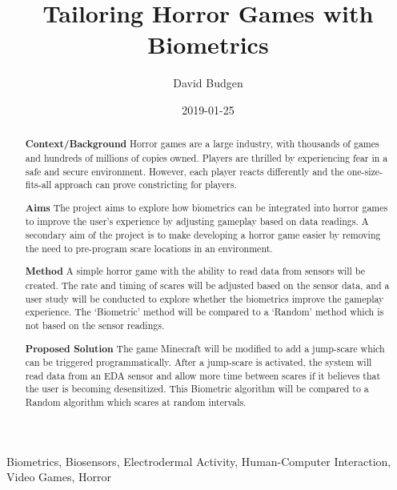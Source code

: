 \documentclass[12pt,a4paper]{article}
\title{Tailoring Horror Games with Biometrics}
\author{David Budgen}
\date{2019-01-25}
\begin{document}
\maketitle

\begin{abstract}


\textbf{Context/Background}
Horror games are a large industry, with thousands of games and hundreds of millions of copies owned. Players are thrilled by experiencing fear in a safe and secure environment. However, each player reacts differently and the one-size-fits-all approach can prove constricting for players.

\textbf{Aims}
The project aims to explore how biometrics can be integrated into horror games to improve the user's experience by adjusting gameplay based on data readings. A secondary aim of the project is to make developing a horror game easier by removing the need to pre-program scare locations in an environment.

\textbf{Method}
A simple horror game with the ability to read data from sensors will be created. The rate and timing of scares will be adjusted based on the sensor data, and a user study will be conducted to explore whether the biometrics improve the gameplay experience. The `Biometric' method will be compared to a `Random' method which is not based on the sensor readings.

\textbf{Proposed Solution}
The game Minecraft will be modified to add a jump-scare which can be triggered programmatically. After a jump-scare is activated, the system will read data from an EDA sensor and allow more time between scares if it believes that the user is becoming desensitized. This Biometric algorithm will be compared to a Random algorithm which scares at random intervals.
\end{abstract}

\begin{keywords}
Biometrics, Biosensors, Electrodermal Activity, Human-Computer Interaction, Video Games, Horror
\end{keywords}
\end{document}
